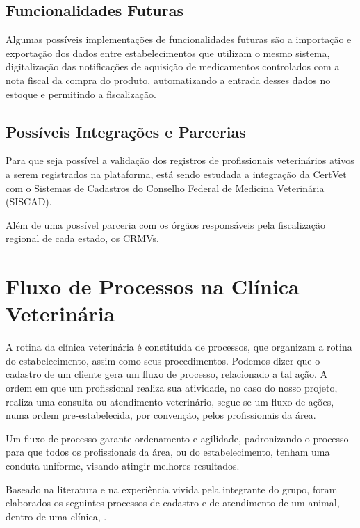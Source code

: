 \documentclass[
    12pt,               %
    openright,          %
    oneside,
    a4paper,            %
    BIBLATEX,           %
    TODO,               %
    english,            %
    brazil              %
    ]{ifsp-spo-inf-ctds}
\begin{document}
        \subsection{Funcionalidades Futuras}
            
            Algumas possíveis implementações de funcionalidades futuras são a importação e exportação dos dados entre estabelecimentos que utilizam o mesmo sistema, digitalização das notificações de aquisição de medicamentos controlados com a nota fiscal da compra do produto, automatizando a entrada desses dados no estoque e permitindo a fiscalização.
        
        \subsection{Possíveis Integrações e Parcerias}
        
            Para que seja possível a validação dos registros de profissionais veterinários ativos a serem registrados na plataforma, está sendo estudada a integração da CertVet com o Sistemas de Cadastros do Conselho Federal de Medicina Veterinária (SISCAD).
        
            Além de uma possível parceria com os órgãos responsáveis pela fiscalização regional de cada estado, os CRMVs.

    \section{Fluxo de Processos na Clínica Veterinária}

    A rotina da clínica veterinária é constituída de processos, que organizam a rotina do estabelecimento, assim como seus procedimentos. Podemos dizer que o cadastro de um cliente gera um fluxo de processo, relacionado a tal ação. A ordem em que um profissional realiza sua atividade, no caso do nosso projeto, realiza uma consulta ou atendimento veterinário, segue-se um fluxo de ações, numa ordem pre-estabelecida, por convenção, pelos profissionais da área. 

    Um fluxo de processo garante ordenamento e agilidade, padronizando o processo para que todos os profissionais da área, ou do estabelecimento, tenham uma conduta uniforme, visando atingir melhores resultados.

    Baseado na literatura e na experiência vivida pela integrante do grupo, foram elaborados os seguintes processos de cadastro e de atendimento de um animal, dentro de uma clínica, .
\end{document}
